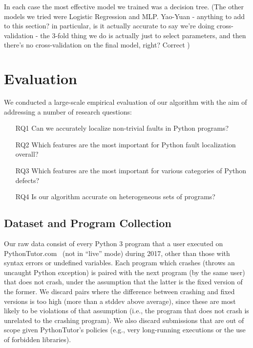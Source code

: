\documentclass[conference]{IEEEtran}
\begin{document}
In each case the most effective model we trained was a decision tree. (The other
models we tried were Logistic Regression and MLP. Yao-Yuan - anything to add to
this section? in particular, is it actually accurate to say we're doing
cross-validation - the 3-fold thing we do is actually just to select parameters,
and then there's no cross-validation on the final model, right? 
%
Correct
)


\section{Evaluation}
\label{sec-eval}

We conducted a large-scale empirical evaluation of our algorithm with the
aim of addressing a number of research questions:
\begin{enumerate}

\item[RQ1]{Can we accurately localize non-trivial faults in Python
programs?}

\item[RQ2]{Which features are the most important for Python fault
localization overall?}

\item[RQ3]{Which features are the most important for various categories of
Python defects?}

\item[RQ4]{Is our algorithm accurate on heterogeneous sets of programs?}

\end{enumerate}

\subsection{Dataset and Program Collection}

Our raw data consist of every Python 3 program that a user executed on
PythonTutor.com~\cite{Guo2013-vu} (not in ``live'' mode) during 2017, other
than those with syntax errors or undefined variables.  Each program which
crashes (throws an uncaught Python exception) is paired with the next
program (by the same user) that does not crash, under the assumption that
the latter is the fixed version of the former. We discard pairs where the
difference between crashing and fixed versions is too high (more than a
stddev above average), since these are most likely to be violations of that
assumption (i.e., the program that does not crash is unrelated to the
crashing program). We also discard submissions that are out of scope given
PythonTutor's policies (e.g., very long-running executions or the
use of forbidden libraries).
\end{document}
